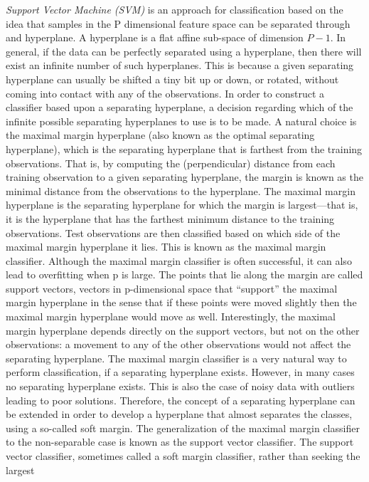 \textit{Support Vector Machine (SVM)} is an approach for classification based on the idea that samples in the P dimensional feature space can be
separated through and hyperplane. A hyperplane is a flat affine sub-space of dimension $P-1$.
In general, if the data can be perfectly separated using a hyperplane, then there will exist an 
infinite number of such hyperplanes. This is because a given separating hyperplane can usually be 
shifted a tiny bit up or down, or rotated, without coming into contact with any of the observations. In 
order to construct a classifier based upon a separating hyperplane, a decision regarding which of the infinite possible separating 
hyperplanes to use is to be made. 
A natural choice is the maximal margin hyperplane (also known as the optimal separating 
hyperplane), which is the separating hyperplane that is farthest from the training observations. That 
is, by computing the (perpendicular) distance from each training observation to a given separating 
hyperplane, the margin is known as the minimal distance from the observations to the hyperplane.
The maximal margin hyperplane is the separating hyperplane for which the margin is largest—that is, 
it is the hyperplane that has the farthest minimum distance 
to the training observations. 
Test observations are then classified based on which side of the 
maximal margin hyperplane it lies. This is known as the maximal margin classifier.
Although the maximal margin classifier is often successful, it can also lead to overfitting when p is 
large.
The points that lie along the margin are called support vectors, vectors in p-dimensional space that
“support” the maximal margin hyperplane in the sense that if these points were moved slightly then 
the maximal margin hyperplane would move as well. Interestingly, the maximal margin hyperplane depends directly on the 
support vectors, but not on the other observations: a movement to any of the 
other observations would not affect the separating hyperplane.
The maximal margin classifier is a very natural way to perform classification, if a separating 
hyperplane exists. However, in many cases no separating hyperplane exists. This 
is also the case of noisy data with outliers leading to poor solutions.
Therefore, the concept of a separating hyperplane can be extended in order to develop a hyperplane that 
almost separates the classes, using a so-called soft margin. The generalization of the maximal margin 
classifier to the non-separable case is known as the support vector classifier.
The support vector classifier, sometimes called a soft margin classifier, rather than seeking the largest 

